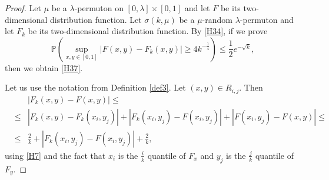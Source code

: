\documentclass[10pt,a4paper]{amsart}
\def\P{{\mathbb {P}}}                       \def\Q{{\mathbb {Q}}}
\begin{document}
\begin{proof}
Let $\mu$ be a $\lambda$-permuton on $[0,\lambda] \times [0,1]$ and let 
$F$ be its two-dimensional distribution function.
Let $\sigma(k, \mu)$ be a $\mu$-random $\lambda$-permuton and let $F_k$ be its 
two-dimensional distribution function.
By \eqref{H34}, if we prove
\begin{equation} \label{H39}
\P \left( \sup_{x,y\in[0,1]} |F(x,y) -F_k(x,y)| \ge 4 k^{-\frac{1}{4}}   \right)
\le \frac{1}{2} e^{-\sqrt{k}},
\end{equation}
then we obtain \eqref{H37}.

Let us use the notation from Definition \ref{def3}.
Let $(x,y)\in R_{i,j}$.
Then
\begin{eqnarray} \label{H18}
&&| F_k(x,y)- F(x,y) |\le \\
&\le & | F_k(x,y)- F_k(x_i,y_j) |+ | F_k(x_i,y_j)- F(x_i,y_j) | +| F(x_i,y_j)- F(x,y) |\le  \nonumber \\
&\le & \frac{2}{k}+ | F_k(x_i,y_j)- F(x_i,y_j) | + \frac{2}{k}, \nonumber
\end{eqnarray}
using \eqref{H7} and the fact that $x_i$ is the $\frac{i}{k}$ quantile of $F_x$ and $y_j$ is the $\frac{j}{k}$ quantile of $F_y$.


\end{proof}
\end{document}

